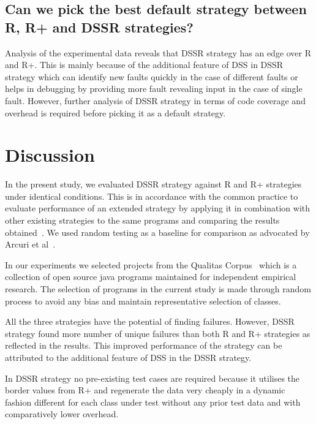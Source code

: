 \documentclass[conference]{IEEEtran}
\begin{document}
\subsection{Can we pick the best default strategy between R, R+ and DSSR strategies?}

Analysis of the experimental data reveals that DSSR strategy has an edge over R and R+. This is mainly because of the additional feature of DSS in DSSR strategy which can identify new faults quickly in the case of different faults or helps in debugging by providing more fault revealing input in the case of single fault. However, further analysis of DSSR strategy in terms of code coverage and overhead is required before picking it as a default strategy.


\section{Discussion}\label{sec:discussion}
\noindent In the present study, we evaluated DSSR strategy against R and R+ strategies under identical conditions. This is in accordance with the common practice to evaluate performance of an extended strategy by applying it in combination with other existing strategies to the same programs and comparing the results obtained~\cite{Gutjahr1999, Hamlet1990}. We used random testing as a baseline for comparison as advocated by Arcuri et al~\cite{Arcuri2012}.

\noindent In our experiments we selected projects from the Qualitas Corpus~\cite{Tempero2010} which is a collection of open source java programs maintained for independent empirical research. %
The selection of programs in the current study is made through random process to avoid any bias and maintain representative selection of classes. 

\noindent All the three strategies have the potential of finding failures. However, DSSR strategy found more number of unique failures than both R and R+ strategies as reflected in the results. This improved performance of the strategy can be attributed to the additional feature of DSS in the DSSR strategy.
 
\noindent In DSSR strategy no pre-existing test cases are required because it utilises the border values from R+ and regenerate the data very cheaply in a dynamic fashion different for each class under test without any prior test data and with comparatively lower overhead. 
 
\end{document}
